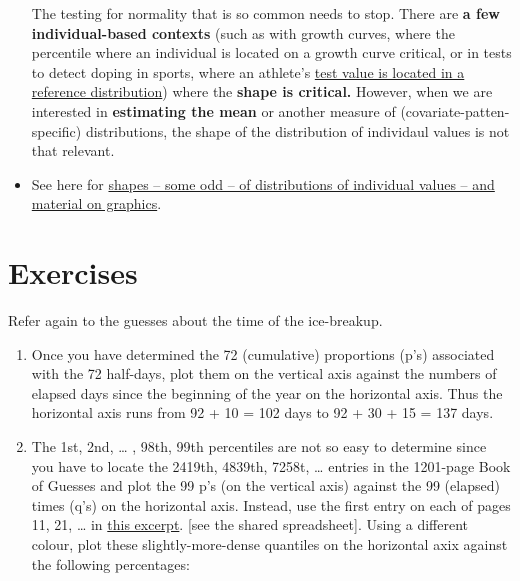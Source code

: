 \documentclass[]{book}
\begin{document}
\begin{itemize}
  The testing for normality that is so common needs to stop. There are \textbf{a few individual-based contexts} (such as with growth curves, where the percentile where an individual is located on a growth curve critical, or in tests to detect doping in sports, where an athlete's \href{http://www.medicine.mcgill.ca/epidemiology/hanley/Reprints/TestingForHumanIGFdoping.pdf}{test value is located in a reference distribution}) where the \textbf{shape is critical.} However, when we are interested in \textbf{estimating the mean} or another measure of (covariate-patten-specific) distributions, the shape of the distribution of individaul values is not that relevant.
\item
  See here for \href{http://www.medicine.mcgill.ca/epidemiology/hanley/bios601/DescriptiveStatistics/}{shapes -- some odd -- of distributions of individual values -- and material on graphics}.
\end{itemize}

\hypertarget{exercises-1}{%
\section{Exercises}\label{exercises-1}}

Refer again to the guesses about the time of the ice-breakup.

\begin{enumerate}
\def\labelenumi{\arabic{enumi}.}
\item
  Once you have determined the 72 (cumulative) proportions (p's) associated with the 72 half-days, plot them on the vertical axis against the numbers of elapsed days since the beginning of the year on the horizontal axis. Thus the horizontal axis runs from 92 + 10 = 102 days to 92 + 30 + 15 = 137 days.
\item
  The 1st, 2nd, \ldots{} , 98th, 99th percentiles are not so easy to determine since you have to locate the 2419th, 4839th, 7258t, \ldots{} entries in the 1201-page Book of Guesses and plot the 99 p's (on the vertical axis) against the 99 (elapsed) times (q's) on the horizontal axis. Instead, use the first entry on each of pages 11, 21, \ldots{} in
  \href{http://www.biostat.mcgill.ca/hanley/bios691/SampledPages.pdf}{this excerpt}. {[}see the shared spreadsheet{]}. Using a different colour, plot these slightly-more-dense quantiles on the horizontal axix against the following percentages:
\end{enumerate}
\end{document}
